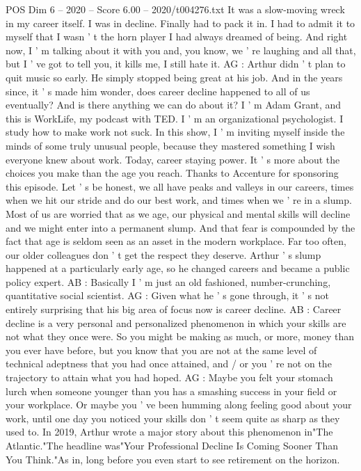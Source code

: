 \begin{textsample}{POS Dim 6 – 2020 – Score 6.00 – 2020/t004276.txt}
It was a slow-moving wreck in my career itself.
I was in decline.
Finally had to pack it in.
I had to admit it to myself that I wasn ' t the horn player I had always dreamed of being.
And right now, I ' m talking about it with you and, you know, we ' re laughing and all that, but I ' ve got to tell you, it kills me, I still hate it.
AG : Arthur didn ' t plan to quit music so early.
He simply stopped being great at his job.
And in the years since, it ' s made him wonder, does career decline happened to all of us eventually?
And is there anything we can do about it?
I ' m Adam Grant, and this is WorkLife, my podcast with TED.
I ' m an organizational psychologist.
I study how to make work not suck.
In this show, I ' m inviting myself inside the minds of some truly unusual people, because they mastered something I wish everyone knew about work.
Today, career staying power.
It ' s more about the choices you make than the age you reach.
Thanks to Accenture for sponsoring this episode.
Let ' s be honest, we all have peaks and valleys in our careers, times when we hit our stride and do our best work, and times when we ' re in a slump.
Most of us are worried that as we age, our physical and mental skills will decline and we might enter into a permanent slump.
And that fear is compounded by the fact that age is seldom seen as an asset in the modern workplace.
Far too often, our older colleagues don ' t get the respect they deserve.
Arthur ' s slump happened at a particularly early age, so he changed careers and became a public policy expert.
AB : Basically I ' m just an old fashioned, number-crunching, quantitative social scientist.
AG : Given what he ' s gone through, it ' s not entirely surprising that his big area of focus now is career decline.
AB : Career decline is a very personal and personalized phenomenon in which your skills are not what they once were.
So you might be making as much, or more, money than you ever have before, but you know that you are not at the same level of technical adeptness that you had once attained, and / or you ' re not on the trajectory to attain what you had hoped.
AG : Maybe you felt your stomach lurch when someone younger than you has a smashing success in your field or your workplace.
Or maybe you ' ve been humming along feeling good about your work, until one day you noticed your skills don ' t seem quite as sharp as they used to.
In 2019, Arthur wrote a major story about this phenomenon in"The Atlantic."The headline was"Your Professional Decline Is Coming Sooner Than You Think."As in, long before you even start to see retirement on the horizon.

\end{textsample}
